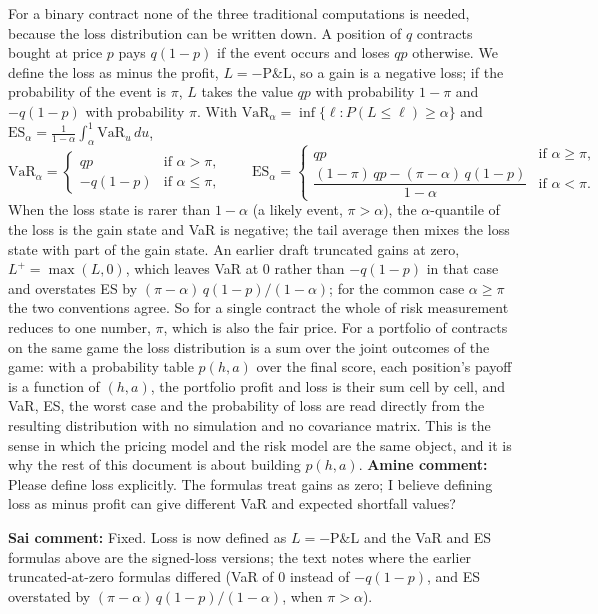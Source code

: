 For a binary contract none of the three traditional computations is needed, because the loss distribution can be written down. A position of $q$ contracts bought at price $p$ pays $q(1-p)$ if the event occurs and loses $qp$ otherwise. We define the loss as minus the profit, $L = -\text{P\&L}$, so a gain is a negative loss; if the probability of the event is $\pi$, $L$ takes the value $qp$ with probability $1-\pi$ and $-q(1-p)$ with probability $\pi$. With $\mathrm{VaR}_\alpha = \inf\{\ell : P(L\le \ell)\ge\alpha\}$ and $\mathrm{ES}_\alpha = \frac{1}{1-\alpha}\int_\alpha^1 \mathrm{VaR}_u\,du$,
\[
\mathrm{VaR}_\alpha = \begin{cases} qp & \text{if } \alpha > \pi,\\ -q(1-p) & \text{if } \alpha \le \pi,\end{cases}
\qquad
\mathrm{ES}_\alpha = \begin{cases} qp & \text{if } \alpha \ge \pi,\\[2pt] \dfrac{(1-\pi)\,qp - (\pi-\alpha)\,q(1-p)}{1-\alpha} & \text{if } \alpha < \pi.\end{cases}
\]
When the loss state is rarer than $1-\alpha$ (a likely event, $\pi>\alpha$), the $\alpha$-quantile of the loss is the gain state and VaR is negative; the tail average then mixes the loss state with part of the gain state. An earlier draft truncated gains at zero, $L^+=\max(L,0)$, which leaves VaR at $0$ rather than $-q(1-p)$ in that case and overstates ES by $(\pi-\alpha)\,q(1-p)/(1-\alpha)$; for the common case $\alpha\ge\pi$ the two conventions agree. So for a single contract the whole of risk measurement reduces to one number, $\pi$, which is also the fair price. For a portfolio of contracts on the same game the loss distribution is a sum over the joint outcomes of the game: with a probability table $p(h,a)$ over the final score, each position's payoff is a function of $(h,a)$, the portfolio profit and loss is their sum cell by cell, and VaR, ES, the worst case and the probability of loss are read directly from the resulting distribution with no simulation and no covariance matrix. This is the sense in which the pricing model and the risk model are the same object, and it is why the rest of this document is about building $p(h,a)$.
{\color{red}\textbf{Amine comment:} Please define loss explicitly. The formulas treat gains as zero; I believe defining loss as minus profit can give different VaR and expected shortfall values?}

{\color{blue}\textbf{Sai comment:} Fixed. Loss is now defined as $L=-\text{P\&L}$ and the VaR and ES formulas above are the signed-loss versions; the text notes where the earlier truncated-at-zero formulas differed (VaR of $0$ instead of $-q(1-p)$, and ES overstated by $(\pi-\alpha)\,q(1-p)/(1-\alpha)$, when $\pi>\alpha$).}

